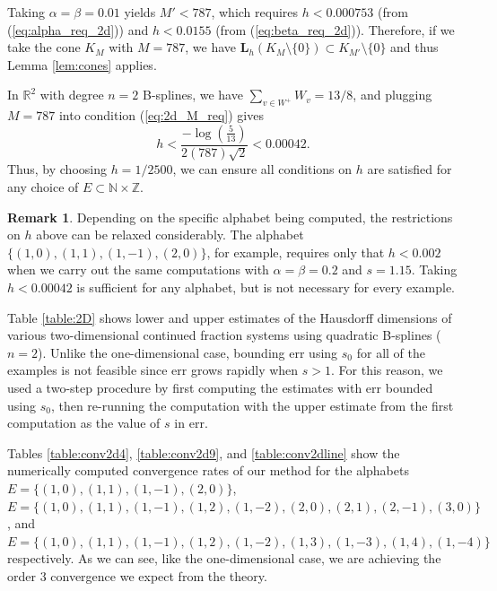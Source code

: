 \documentclass[10pt]{article}
\theoremstyle{definition}
\newtheorem*{remark}{Remark}
\numberwithin{equation}{section}
\numberwithin{figure}{section}
\numberwithin{table}{section}
\begin{document}
Taking $\alpha=\beta=0.01$ yields $M'<787$, which requires $h<0.000753$ (from (\ref{eq:alpha_req_2d})) and $h<0.0155$ (from (\ref{eq:beta_req_2d})). Therefore, if we take the cone $K_M$ with $M=787$, we have $\mathbf{L}_h(K_M\setminus\{0\})\subset K_{M'}\setminus\{0\}$ and thus Lemma \ref{lem:cones} applies. 

In $\mathbb{R}^2$ with degree $n=2$ B-splines, we have $\sum_{v\in W^+}W_v=13/8$, and plugging $M=787$ into condition (\ref{eq:2d_M_req}) gives
$$h<\frac{-\log(\frac{5}{13})}{2(787)\sqrt2}<0.00042.$$
Thus, by choosing $h=1/2500$, we can ensure all conditions on $h$ are satisfied for any choice of $E\subset\mathbb{N}\times\mathbb{Z}$. %

\begin{remark}
Depending on the specific alphabet being computed, the restrictions on $h$ above can be relaxed considerably. The alphabet $\{(1,0),(1,1),(1,-1),(2,0)\}$, for example, requires only that $h<0.002$ when we carry out the same computations with $\alpha=\beta=0.2$ and $s=1.15$. Taking $h<0.00042$ is sufficient for any alphabet, but is not necessary for every example.
\end{remark}

Table \ref{table:2D} shows lower and upper estimates of the Hausdorff dimensions of various two-dimensional continued fraction systems using quadratic B-splines ($n=2$). Unlike the one-dimensional case, bounding $\mathrm{err}$ using $s_0$ for all of the examples is not feasible since $\mathrm{err}$ grows rapidly when $s>1$. For this reason, we used a two-step procedure by first computing the estimates with $\mathrm{err}$ bounded using $s_0$, then re-running the computation with the upper estimate from the first computation as the value of $s$ in $\mathrm{err}$. %

Tables \ref{table:conv2d4}, \ref{table:conv2d9}, and \ref{table:conv2dline} show the numerically computed convergence rates of our method for the alphabets $E=\{(1,0),(1,1),(1,-1),(2,0)\}$, $E=\{(1,0),(1,1),(1,-1),(1,2),(1,-2),(2,0),(2,1),(2,-1),(3,0)\}$, and $E=\{(1,0),(1,1),(1,-1),(1,2),(1,-2),(1,3),(1,-3),(1,4),(1,-4)\}$ respectively. As we can see, like the one-dimensional case, we are achieving the order 3 convergence we expect from the theory. 
\end{document}
